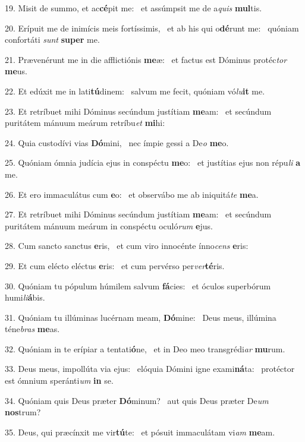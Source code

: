 19. Misit de summo, et ac\textbf{cé}pit me: \ast\  et assúmpsit me de a\textit{quis} \textbf{mul}tis.\

20. Erípuit me de inimícis meis fortíssimis, \dag\  et ab his qui o\textbf{dé}runt me: \ast\  quóniam confortáti \textit{sunt} \textbf{su}\textbf{per} me.\

21. Prævenérunt me in die afflictiónis \textbf{me}æ: \ast\  et factus est Dóminus protéc\textit{tor} \textbf{me}us.\

22. Et edúxit me in lati\textbf{tú}dinem: \ast\  salvum me fecit, quóniam vó\textit{lu}\textbf{it} me.\

23. Et retríbuet mihi Dóminus secúndum justítiam \textbf{me}am: \ast\  et secúndum puritátem mánuum meárum retríbu\textit{et} \textbf{mi}hi:\

24. Quia custodívi vias \textbf{Dó}mini, \ast\  nec ímpie gessi a De\textit{o} \textbf{me}o.\

25. Quóniam ómnia judícia ejus in conspéctu \textbf{me}o: \ast\  et justítias ejus non répu\textit{li} \textbf{a} me.\

26. Et ero immaculátus cum \textbf{e}o: \ast\  et observábo me ab iniquitá\textit{te} \textbf{me}a.\

27. Et retríbuet mihi Dóminus secúndum justítiam \textbf{me}am: \ast\  et secúndum puritátem mánuum meárum in conspéctu oculó\textit{rum} \textbf{e}jus.\

28. Cum sancto sanctus \textbf{e}ris, \ast\  et cum viro innocénte ínno\textit{cens} \textbf{e}ris:\

29. Et cum elécto eléctus \textbf{e}ris: \ast\  et cum pervérso per\textit{ver}\textbf{té}ris.\

30. Quóniam tu pópulum húmilem salvum \textbf{fá}cies: \ast\  et óculos superbórum humi\textit{li}\textbf{á}bis.\

31. Quóniam tu illúminas lucérnam meam, \textbf{Dó}mine: \ast\  Deus meus, illúmina téne\textit{bras} \textbf{me}as.\

32. Quóniam in te erípiar a tentati\textbf{ó}ne, \ast\  et in Deo meo transgrédi\textit{ar} \textbf{mu}rum.\

33. Deus meus, impollúta via ejus: \dag\  elóquia Dómini igne exami\textbf{ná}ta: \ast\  protéctor est ómnium speránti\textit{um} \textbf{in} se.\

34. Quóniam quis Deus præter \textbf{Dó}minum? \ast\  aut quis Deus præter De\textit{um} \textbf{nos}trum?\

35. Deus, qui præcínxit me vir\textbf{tú}te: \ast\  et pósuit immaculátam vi\textit{am} \textbf{me}am.\

